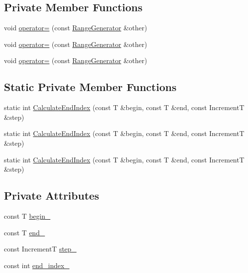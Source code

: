 \subsection*{Private Member Functions}
\begin{DoxyCompactItemize}
\item 
void \mbox{\hyperlink{classtesting_1_1internal_1_1_range_generator_a00ef0f268e44d48d129a52bf0f9f9539}{operator=}} (const \mbox{\hyperlink{classtesting_1_1internal_1_1_range_generator}{Range\+Generator}} \&other)
\item 
void \mbox{\hyperlink{classtesting_1_1internal_1_1_range_generator_a00ef0f268e44d48d129a52bf0f9f9539}{operator=}} (const \mbox{\hyperlink{classtesting_1_1internal_1_1_range_generator}{Range\+Generator}} \&other)
\item 
void \mbox{\hyperlink{classtesting_1_1internal_1_1_range_generator_a00ef0f268e44d48d129a52bf0f9f9539}{operator=}} (const \mbox{\hyperlink{classtesting_1_1internal_1_1_range_generator}{Range\+Generator}} \&other)
\end{DoxyCompactItemize}
\subsection*{Static Private Member Functions}
\begin{DoxyCompactItemize}
\item 
static int \mbox{\hyperlink{classtesting_1_1internal_1_1_range_generator_af617ad3b3e40bef967f1055dc7ae8ae6}{Calculate\+End\+Index}} (const T \&begin, const T \&end, const IncrementT \&step)
\item 
static int \mbox{\hyperlink{classtesting_1_1internal_1_1_range_generator_af617ad3b3e40bef967f1055dc7ae8ae6}{Calculate\+End\+Index}} (const T \&begin, const T \&end, const IncrementT \&step)
\item 
static int \mbox{\hyperlink{classtesting_1_1internal_1_1_range_generator_af617ad3b3e40bef967f1055dc7ae8ae6}{Calculate\+End\+Index}} (const T \&begin, const T \&end, const IncrementT \&step)
\end{DoxyCompactItemize}
\subsection*{Private Attributes}
\begin{DoxyCompactItemize}
\item 
const T \mbox{\hyperlink{classtesting_1_1internal_1_1_range_generator_af16307fd21766bcbb973d8b3335f1a3f}{begin\+\_\+}}
\item 
const T \mbox{\hyperlink{classtesting_1_1internal_1_1_range_generator_ac36eecbaf80b51a59d59a4a4fdf5b5db}{end\+\_\+}}
\item 
const IncrementT \mbox{\hyperlink{classtesting_1_1internal_1_1_range_generator_ae7f3c4b76d8610f030fdd12285ebd8fb}{step\+\_\+}}
\item 
const int \mbox{\hyperlink{classtesting_1_1internal_1_1_range_generator_a336878a1871133e49665df60ea944076}{end\+\_\+index\+\_\+}}
\end{DoxyCompactItemize}
